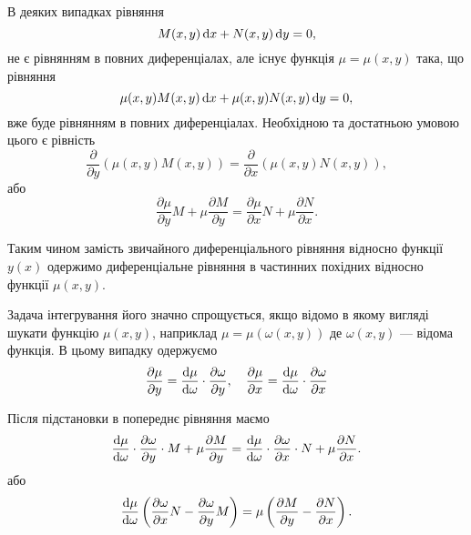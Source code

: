 В деяких випадках рівняння
\begin{equation*}
	M(x, y) \mathop{}\!\mathrm{d} x + N(x, y) \mathop{}\!\mathrm{d} y = 0,
\end{equation*}
не є рівнянням в повних диференціалах, але існує функція $\mu = \mu(x,y)$ така, що рівняння
\begin{equation*}
	\mu(x,y) M(x, y) \mathop{}\!\mathrm{d} x + \mu(x,y) N(x, y) \mathop{}\!\mathrm{d} y = 0,
\end{equation*}
вже буде рівнянням в повних диференціалах. Необхідною та достатньою умовою цього є рівність
\begin{equation*}
	\frac{\partial}{\partial y} (\mu(x,y) M(x, y)) = \frac{\partial}{\partial x} (\mu(x,y) N(x, y)),
\end{equation*}
або
\begin{equation*}
	\frac{\partial \mu}{\partial y} M + \mu \frac{\partial M}{\partial y} = \frac{\partial \mu}{\partial x} N + \mu \frac{\partial N}{\partial x}.
\end{equation*}

Таким чином замість звичайного диференціального рівняння відносно функції $y(x)$ одержимо диференціальне рівняння в частинних похідних відносно функції $\mu(x, y)$. \parvskip

Задача інтегрування його значно спрощується, якщо відомо в якому вигляді шукати функцію $\mu(x,y)$, наприклад $\mu = \mu(\omega(x,y))$ де $\omega(x,y)$ --- відома функція. В цьому випадку одержуємо
\begin{equation*}
	\frac{\partial \mu}{\partial y} = \frac{\mathop{}\!\mathrm{d} \mu}{\mathop{}\!\mathrm{d} \omega} \cdot \frac{\partial \omega}{\partial y}, \quad \frac{\partial \mu}{\partial x} = \frac{\mathop{}\!\mathrm{d} \mu}{\mathop{}\!\mathrm{d} \omega} \cdot \frac{\partial \omega}{\partial x}
\end{equation*}

Після підстановки в попереднє рівняння маємо
\begin{equation*}
	\frac{\mathop{}\!\mathrm{d} \mu}{\mathop{}\!\mathrm{d} \omega} \cdot \frac{\partial \omega}{\partial y} \cdot M + \mu \frac{\partial M}{\partial y} = \frac{\mathop{}\!\mathrm{d} \mu}{\mathop{}\!\mathrm{d} \omega} \cdot \frac{\partial \omega}{\partial x} \cdot N + \mu \frac{\partial N}{\partial x}.
\end{equation*}
або
\begin{equation*}
	\frac{\mathop{}\!\mathrm{d} \mu}{\mathop{}\!\mathrm{d} \omega} \left( \frac{\partial \omega}{\partial x} N - \frac{\partial \omega}{\partial y} M \right) = \mu \left( \frac{\partial M}{\partial y} - \frac{\partial N}{\partial x} \right).
\end{equation*}

